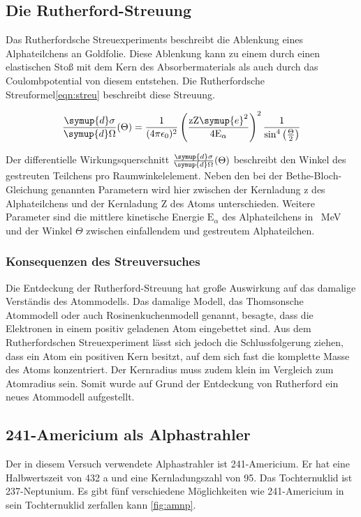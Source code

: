 \subsection{Die Rutherford-Streuung}
Das Rutherfordsche Streuexperiments beschreibt die Ablenkung eines Alphateilchens
an Goldfolie. Diese Ablenkung kann zu einem durch einen elastischen Stoß mit
dem Kern des Absorbermaterials als auch durch das Coulombpotential von diesem
entstehen. Die Rutherfordsche Streuformel\eqref{eqn:streu} beschreibt diese Streuung.

\begin{equation}
  \frac{\symup{d} \sigma}{\symup{d} \Omega} (\Theta) =
  \frac{1}{(4 \pi \epsilon_0)^2} \left(\frac{\text{z} \text{Z} \symup{e}^2}
  {4 \text{E}_\alpha}\right)^2 \frac{1}{\sin^4\left(\frac{\Theta}{2}\right)}
  \label{eqn:streu}
\end{equation}

Der differentielle Wirkungsquerschnitt $\frac{\symup{d} \sigma}{\symup{d} \Omega} (\Theta)$
beschreibt den Winkel des gestreuten Teilchens pro Raumwinkelelement. Neben den
bei der Bethe-Bloch-Gleichung genannten Parametern wird hier zwischen der
Kernladung z des Alphateilchens und der Kernladung Z des Atoms unterschieden.
Weitere Parameter sind die mittlere kinetische Energie $\text{E}_\alpha$ des
Alphateilchens in \SI{}{\mega\electronvolt} und der Winkel $\Theta$ zwischen
einfallendem und gestreutem Alphateilchen.

\subsubsection{Konsequenzen des Streuversuches}
Die Entdeckung der Rutherford-Streuung hat große Auswirkung auf das damalige
Verständis des Atommodells. Das damalige Modell, das Thomsonsche Atommodell oder
auch Rosinenkuchenmodell genannt, besagte, dass die Elektronen in einem
positiv geladenen Atom eingebettet sind. Aus dem Rutherfordschen Streuexperiment
lässt sich jedoch die Schlussfolgerung ziehen, dass ein Atom ein positiven
Kern besitzt, auf dem sich fast die komplette Masse des Atoms konzentriert. Der
Kernradius muss zudem klein im Vergleich zum Atomradius sein. Somit wurde auf
Grund der Entdeckung von Rutherford ein neues Atommodell aufgestellt.

\subsection{241-Americium als Alphastrahler}
Der in diesem Versuch verwendete Alphastrahler ist 241-Americium. Er hat eine
Halbwertszeit von 432 a und eine Kernladungszahl von 95. Das Tochternuklid
ist 237-Neptunium. Es gibt fünf verschiedene Möglichkeiten wie 241-Americium in
sein Tochternuklid zerfallen kann \ref{fig:amnp}.

